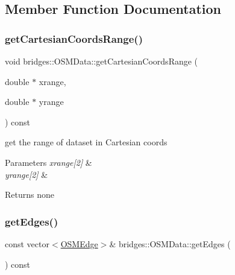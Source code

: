 \subsection{Member Function Documentation}
\mbox{\label{classbridges_1_1_o_s_m_data_ade3af326972e31ce991798e800fbbd5b}} 
\subsubsection{\texorpdfstring{get\+Cartesian\+Coords\+Range()}{getCartesianCoordsRange()}}
{\footnotesize\ttfamily void bridges\+::\+O\+S\+M\+Data\+::get\+Cartesian\+Coords\+Range (\begin{DoxyParamCaption}\item[{double $\ast$}]{xrange,  }\item[{double $\ast$}]{yrange }\end{DoxyParamCaption}) const\hspace{0.3cm}{\ttfamily [inline]}}

get the range of dataset in Cartesian coords


\begin{DoxyParams}{Parameters}
{\em xrange\mbox{[}2\mbox{]}} & \\
\hline
{\em yrange\mbox{[}2\mbox{]}} & \\
\hline
\end{DoxyParams}
\begin{DoxyReturn}{Returns}
none 
\end{DoxyReturn}
\mbox{\label{classbridges_1_1_o_s_m_data_a0a226c840f69547f5d4e53dd7d4ef5d3}} 
\subsubsection{\texorpdfstring{get\+Edges()}{getEdges()}}
{\footnotesize\ttfamily const vector$<$\mbox{\hyperlink{classbridges_1_1_o_s_m_edge}{O\+S\+M\+Edge}}$>$\& bridges\+::\+O\+S\+M\+Data\+::get\+Edges (\begin{DoxyParamCaption}{ }\end{DoxyParamCaption}) const\hspace{0.3cm}{\ttfamily [inline]}}

